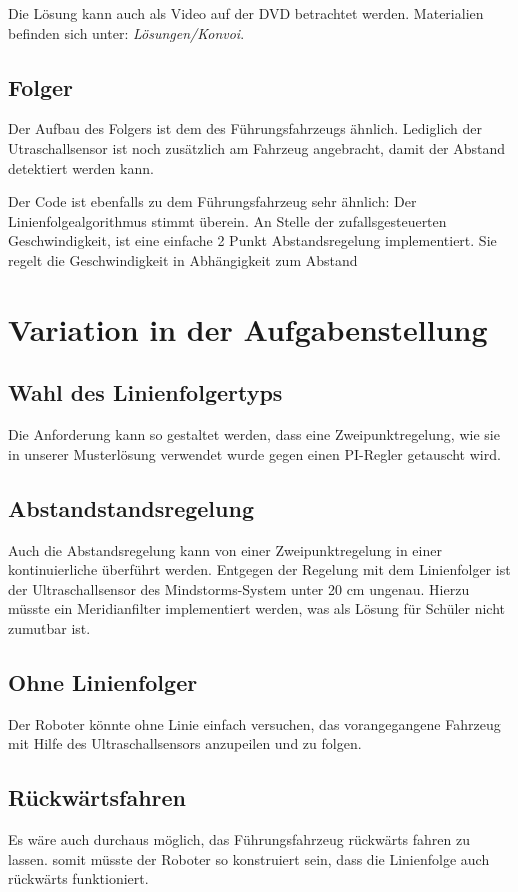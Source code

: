 Die Lösung kann auch als Video auf der DVD betrachtet werden. Materialien befinden sich unter: \textit{Lösungen/Konvoi}.
    
\subsection{Folger}
Der Aufbau des Folgers ist dem des Führungsfahrzeugs ähnlich. Lediglich der Utraschallsensor ist noch zusätzlich am Fahrzeug angebracht, damit der Abstand detektiert werden kann.

Der Code ist ebenfalls zu dem Führungsfahrzeug sehr ähnlich: Der Linienfolgealgorithmus stimmt überein. An Stelle der zufallsgesteuerten Geschwindigkeit, ist eine einfache 2 Punkt Abstandsregelung implementiert. Sie regelt die Geschwindigkeit in Abhängigkeit zum Abstand
    
\section{Variation in der Aufgabenstellung}
\subsection{Wahl des Linienfolgertyps}
Die Anforderung kann so gestaltet werden, dass eine Zweipunktregelung, wie sie in unserer Musterlösung verwendet wurde gegen einen PI-Regler getauscht wird.
    
\subsection{Abstandstandsregelung}
Auch die Abstandsregelung kann von einer Zweipunktregelung in einer kontinuierliche überführt werden. Entgegen der Regelung mit dem Linienfolger ist der Ultraschallsensor des Mindstorms-System unter 20 cm ungenau. Hierzu müsste ein Meridianfilter implementiert werden, was als Lösung für Schüler nicht zumutbar ist.
    
\subsection{Ohne Linienfolger}
Der Roboter könnte ohne Linie einfach versuchen, das vorangegangene Fahrzeug mit Hilfe des Ultraschallsensors anzupeilen und zu folgen.
      
\subsection{Rückwärtsfahren}
Es wäre auch durchaus möglich, das Führungsfahrzeug rückwärts fahren zu lassen. somit müsste der Roboter so konstruiert sein, dass die Linienfolge auch rückwärts funktioniert.
